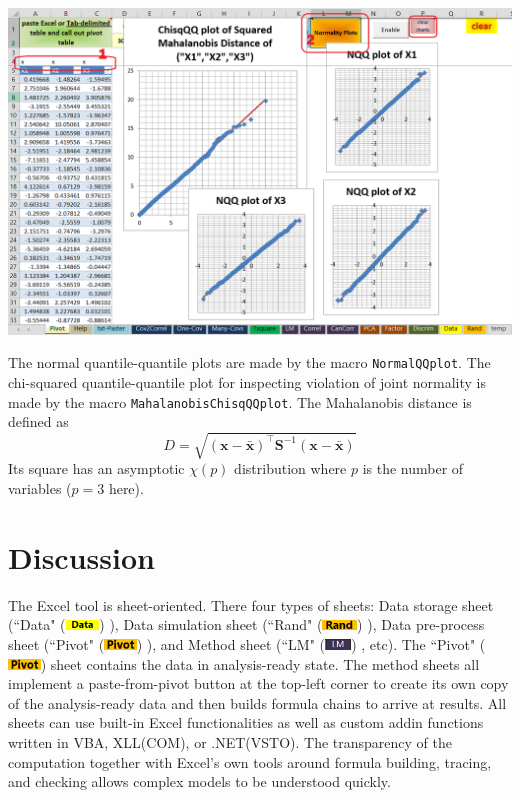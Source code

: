 \documentclass[article]{jss}
\numberwithin{equation}{subsection}
\newcommand{\shtData}{``Data" (\includegraphics[height=8pt, keepaspectratio=true]{DataSheetTab_png}) }
\newcommand{\shtRand}{``Rand" (\includegraphics[height=8pt, keepaspectratio=true]{RandSheetTab_png}) }
\newcommand{\shtPivot}{``Pivot" (\includegraphics[height=8pt, keepaspectratio=true]{PivotSheetTab_png}) }
\newcommand{\shtLM}{``LM" (\includegraphics[height=8pt, keepaspectratio=true]{LMSheetTab_png}) }
\begin{document}
\begin{enumerate}
\begin{center}
	        \includegraphics[width=\linewidth, keepaspectratio=true]{PivotSheetNormalityPlots_png}
        \end{center}
        The normal quantile-quantile plots are made by the  macro \texttt{NormalQQplot}. The chi-squared quantile-quantile plot for inspecting violation of joint normality is made by the macro \texttt{MahalanobisChisqQQplot}. The Mahalanobis distance is defined as \[D = \sqrt {{{\left( {\textbf{x} - \bar{\textbf{x}}} \right)}^ \intercal }{\textbf{S}^{ - 1}}\left( {\textbf{x} - \bar{\textbf{x}}} \right)} \]
        Its square has an asymptotic $\chi(p)$ distribution where $p$ is the number of variables ($p=3$ here).
        \end{enumerate}
        
        
        
        \section[software]{Discussion}
        The Excel tool is sheet-oriented. There four types of sheets: Data storage sheet (\shtData), Data simulation sheet (\shtRand), Data pre-process sheet (\shtPivot), and Method sheet (\shtLM, etc). The \shtPivot sheet contains the data in analysis-ready state. The method sheets all implement a paste-from-pivot button at the top-left corner to create its own copy of the analysis-ready data and then builds formula chains to arrive at results. All sheets can use built-in Excel functionalities as well as custom addin functions written in VBA, XLL(COM), or .NET(VSTO). The transparency of the computation together with Excel's own tools around formula building, tracing, and checking allows complex models to be understood quickly.
        
        
        
\end{document}
